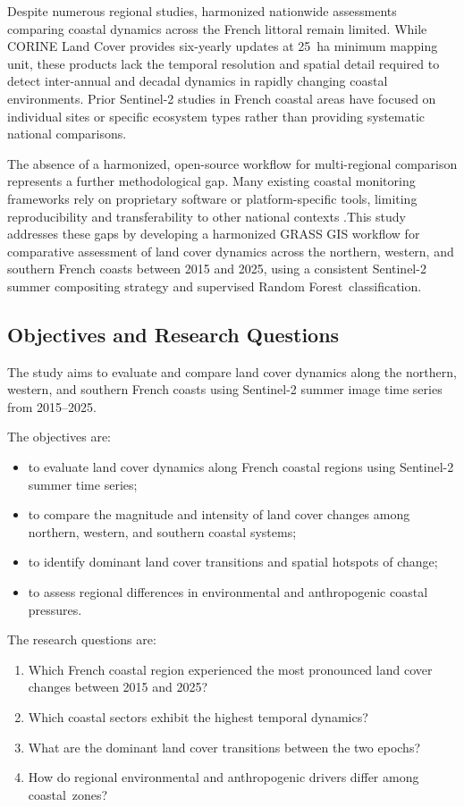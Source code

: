 \documentclass[coasts,article,accept,pdftex,moreauthors]{Definitions/mdpi}
\begin{document}
Despite numerous regional studies, harmonized nationwide assessments comparing coastal dynamics across the French littoral remain limited. While CORINE Land Cover provides six-yearly updates at 25~ha minimum mapping unit, these products lack the temporal resolution and spatial detail required to detect inter-annual and decadal dynamics in rapidly changing coastal environments. Prior Sentinel-2 studies in French coastal areas have focused on individual sites or specific ecosystem types rather than providing systematic national comparisons.

The absence of a harmonized, open-source workflow for multi-regional comparison represents a further methodological gap. Many existing coastal monitoring frameworks rely on proprietary software or platform-specific tools, limiting reproducibility and transferability to other national contexts \citep{camara2020open,ferreira2021reproducible,Lemenkova2023GRASS}.This study addresses these gaps by developing a harmonized GRASS GIS workflow for comparative assessment of land cover dynamics across the northern, western, and southern French coasts between 2015 and 2025, using a consistent Sentinel-2 summer compositing strategy and supervised Random \linebreak  Forest~classification.

\subsection{Objectives and Research Questions}

The study aims to evaluate and compare land cover dynamics along the northern, western, and southern French coasts using Sentinel-2 summer image time series from 2015–2025. 

The objectives are:
\begin{itemize}
\item to evaluate land cover dynamics along French coastal regions using Sentinel-2 summer time series;
\item to compare the magnitude and intensity of land cover changes among northern, western, and southern coastal systems;
\item to identify dominant land cover transitions and spatial hotspots of change;
\item to assess regional differences in environmental and anthropogenic coastal pressures.
\end{itemize}

The research questions are:
\begin{enumerate}[leftmargin=*,labelsep=5mm]
\item Which French coastal region experienced the most pronounced land cover changes between 2015 and 2025?
\item Which coastal sectors exhibit the highest temporal dynamics?
\item What are the dominant land cover transitions between the two epochs?
\item How do regional environmental and anthropogenic drivers differ among coastal~zones?
\end{enumerate}
\end{document}
